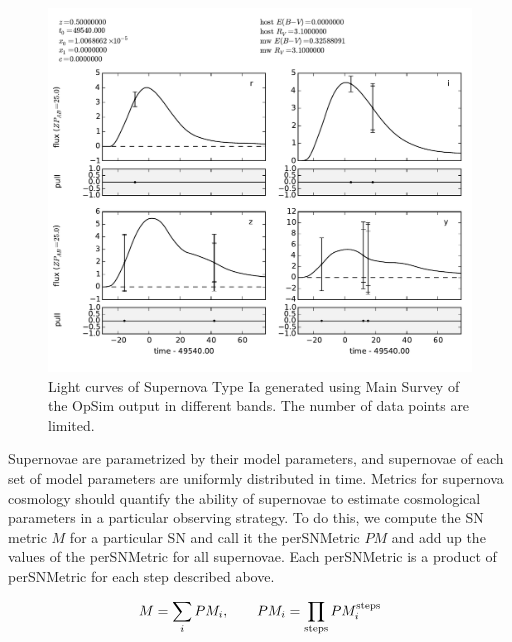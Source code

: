 \begin{figure}[tbh!]
\includegraphics[angle=0,width=0.99\hsize:,clip]{figs/SN_309_lc.pdf}
\caption{Light curves of Supernova Type Ia generated using Main Survey of the OpSim output in different bands. The number of data points are limited. 
}
\label{fig:SNIaLCopsimmain}
\end{figure}
Supernovae are parametrized by their model parameters, and supernovae of each
set of model parameters are uniformly distributed in time.
Metrics for supernova cosmology should quantify the ability of supernovae 
to estimate cosmological parameters in a particular observing strategy. 
To do this, we compute the SN metric $M$ for a particular SN and call it the 
perSNMetric $PM$ and add up the values of the perSNMetric for all supernovae. 
Each perSNMetric is a product of perSNMetric for each step described above.

\begin{equation}
M = \sum_i PM_i, \qquad PM_i = \prod_{\rm{steps}} PM_i^{\rm{steps}}
\end{equation}

